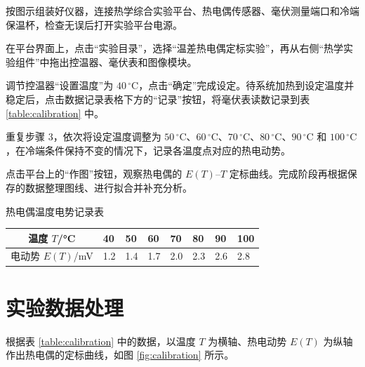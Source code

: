 \documentclass{../template/myrpt}
\begin{document}
\begin{experimentsteps}
  \item 按图示组装好仪器，连接热学综合实验平台、热电偶传感器、毫伏测量端口和冷端保温杯，检查无误后打开实验平台电源。
  \item 在平台界面上，点击“实验目录”，选择“温差热电偶定标实验”，再从右侧“热学实验组件”中拖出控温器、毫伏表和图像模块。
  \item 调节控温器“设置温度”为 $40\,^{\circ}\mathrm{C}$，点击“确定”完成设定。待系统加热到设定温度并稳定后，点击数据记录表格下方的“记录”按钮，将毫伏表读数记录到表 \ref{table:calibration} 中。
  \item 重复步骤 3，依次将设定温度调整为 $50\,^{\circ}\mathrm{C}$、$60\,^{\circ}\mathrm{C}$、$70\,^{\circ}\mathrm{C}$、$80\,^{\circ}\mathrm{C}$、$90\,^{\circ}\mathrm{C}$ 和 $100\,^{\circ}\mathrm{C}$，在冷端条件保持不变的情况下，记录各温度点对应的热电动势。
  \item 点击平台上的“作图”按钮，观察热电偶的 $E(T)$--$T$ 定标曲线。完成阶段再根据保存的数据整理图线、进行拟合并补充分析。
\end{experimentsteps}


\begin{LabRecordTable}
  \centering
  \caption{热电偶温度电势记录表}
  \label{table:calibration}
  \renewcommand{\arraystretch}{1.25}
  \setlength{\tabcolsep}{3.5pt}
  \begin{tabularx}{\textwidth}{c *{7}{Y}}
    \toprule
    温度 $T$/\si{\celsius} & 40 & 50 & 60 & 70 & 80 & 90 & 100 \\
    \midrule
    电动势 $E(T)$/\si{\milli\volt} & 1.2 & 1.4 & 1.7 & 2.0 & 2.3 & 2.6 & 2.8 \\
    \bottomrule
  \end{tabularx}
\end{LabRecordTable}

\section{实验数据处理}

根据表 \ref{table:calibration} 中的数据，以温度 $T$ 为横轴、热电动势 $E(T)$ 为纵轴作出热电偶的定标曲线，如图 \ref{fig:calibration} 所示。
\end{document}
